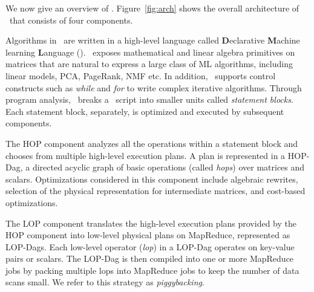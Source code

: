 We now give an overview of \systemmlit. Figure~\ref{fig:arch} shows the overall 
architecture of \systemmlit\ that consists of four components. 

 Algorithms in \systemmlit\ are written in a high-level language 
called {\bf D}eclarative {\bf M}achine learning {\bf L}anguage (\dmlr). \dmlr\ exposes 
mathematical and linear algebra primitives on matrices that are natural to express a 
large class of ML algorithms, including linear models, PCA, PageRank, NMF etc. In addition, \dmlr\ supports 
control constructs such as \emph{while} and \emph{for} to write complex iterative 
algorithms. Through program analysis, \systemmlit\ breaks a \dmlr\ script into smaller 
units called {\it statement blocks}. Each statement block, separately, is optimized and executed by subsequent
components.

 The HOP component analyzes all the 
operations within a statement block and
chooses from multiple high-level execution plans. A plan is represented in
a HOP-Dag, a directed acyclic graph of basic operations (called \textit{hops}) over matrices and
scalars. Optimizations considered in this component include algebraic rewrites, selection of the physical representation for
intermediate matrices, and cost-based optimizations.


 The LOP component translates the 
high-level execution plans provided by the HOP component into low-level physical plans on MapReduce,
represented as LOP-Dags. Each low-level operator (\textit{lop}) in a LOP-Dag operates on
key-value pairs or scalars. The LOP-Dag is then compiled into one or more MapReduce jobs by packing
multiple lops into MapReduce jobs to keep the number of data scans small. We refer to this strategy
as {\em piggybacking}.

